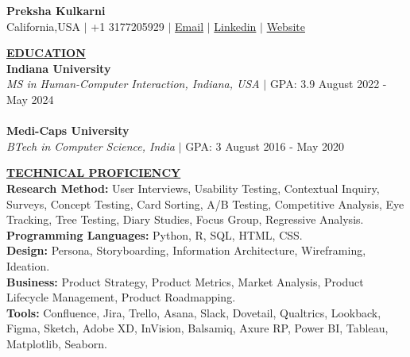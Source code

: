 \documentclass{article}
\begin{document}
\begin{center}
\thispagestyle{empty}
\large \textbf{Preksha Kulkarni \\}
\normalsize California,USA $\mid$ +1 3177205929 $\mid$  \href{mailto:prekshakulkarni33@gmail.com}{Email} $\mid$ \href{https://www.linkedin.com/in/prekshakulkarni/}{Linkedin} $\mid$ \href{www.prekshakulkarni.com}{Website} \\
\hrulefill
\end{center}



\noindent \textbf{\underline{EDUCATION}} \\
\textbf{Indiana University} \hfill  \\
\textit{MS in Human-Computer Interaction, Indiana, USA } $\mid$ GPA: 3.9 \hfill August 2022 - May 2024 \\ \\
\textbf{Medi-Caps University} \hfill  \\
\textit{BTech in Computer Science, India} $\mid$ GPA: 3 \hfill August 2016 - May 2020 

\vspace{2mm}

\noindent \textbf{\underline{TECHNICAL PROFICIENCY}} \\
\noindent \textbf{Research Method:} User Interviews, Usability Testing, Contextual Inquiry, Surveys, Concept Testing, Card Sorting, A/B Testing, Competitive Analysis, Eye Tracking, Tree Testing, Diary Studies, Focus Group, Regressive Analysis. \\
\noindent \textbf{Programming Languages:} Python, R, SQL, HTML, CSS. \\
\noindent \textbf{Design:} Persona, Storyboarding, Information Architecture, Wireframing, Ideation. \\
\noindent \textbf{Business:} Product Strategy, Product Metrics, Market Analysis, Product Lifecycle Management, Product Roadmapping. \\
\noindent \textbf{Tools:} Confluence, Jira, Trello, Asana, Slack, Dovetail, Qualtrics, Lookback, Figma, Sketch, Adobe XD, InVision, Balsamiq, Axure RP, Power BI, Tableau, Matplotlib, Seaborn.

\vspace{2mm}
\end{document}
